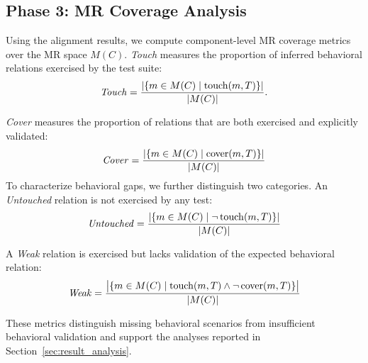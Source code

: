 \subsection{Phase 3: MR Coverage Analysis}\label{sec:approach:completeness}
Using the alignment results, we compute component-level MR coverage metrics over the MR space $M(C)$. \textit{Touch} measures the proportion of inferred behavioral relations exercised by the test suite:
{\small
\[
\mathit{Touch} = \frac{|\{ m \in M(C) \mid \operatorname{touch}(m,T) \}|}{|M(C)|}.
\] 
}

\textit{Cover} measures the proportion of relations that are both exercised and explicitly validated:
{\small
\[
\mathit{Cover} = \frac{|\{ m \in M(C) \mid \operatorname{cover}(m,T) \}|}{|M(C)|}
\] 
}
To characterize behavioral gaps, we further distinguish two categories. An \emph{Untouched} relation is not exercised by any test:
{\small
\[
\mathit{Untouched} = \frac{|\{ m \in M(C) \mid \neg \operatorname{touch}(m,T) \}|}{|M(C)|}
\]}

A \emph{Weak} relation is exercised but lacks validation of the expected behavioral relation:
{\small
\[
\mathit{Weak}=\frac{
  \bigl| \{ m \in M(C) \mid \operatorname{touch}(m,T) \land \neg \operatorname{cover}(m,T) \} \bigr|
}{|M(C)|}
\]
}

These metrics distinguish missing behavioral scenarios from insufficient behavioral validation and support the analyses reported in Section~\ref{sec:result_analysis}.

